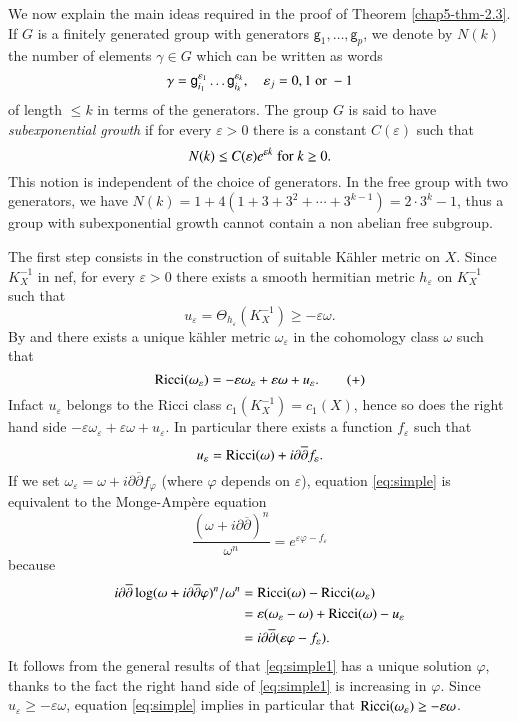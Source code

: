 We now explain the main ideas required in the proof of Theorem \ref{chap5-thm-2.3}. If $G$ is a finitely generated group with generators $\mathsf{g}_{1},\ldots, \mathsf{g}_{p}$, we denote by $N(k)$ the number of elements $\gamma \in G$ which can be written as words
$$
\gamma = \mathsf{g}_{i_{1}}^{\varepsilon_{1}}\ldots\mathsf{g}_{i_{k}}^{\varepsilon_{k}}, \quad \varepsilon_{j} = 0, 1 \; \text{\rm or} \; -1
$$
of length $\leq k$ in terms of the generators. The group $G$ is said to have \textit{subexponential growth} if for every $\varepsilon > 0$ there is a constant $C(\varepsilon)$ such that
$$
N(k) \leq C(\varepsilon)e^{\varepsilon k}\; \text{\rm for} \; k\geq 0.
$$
This notion is independent of the choice of generators. In the free group with two generators, we have $N(k) = 1+4(1+3+3^{2}+\cdots + 3^{k-1}) =2 \cdot 3^{k} - 1$, thus a group with subexponential growth cannot contain a non abelian free subgroup.

The first step consists in the construction of suitable K\"ahler metric on $X$. Since $K_{X}^{-1}$ in nef, for every $\varepsilon > 0$ there exists a smooth hermitian metric $h_{\varepsilon}$ on $K_{X}^{-1}$ such that
$$
u_{\varepsilon} = \Theta _{h_{\varepsilon}}(K_{X}^{-1}) \geq -\varepsilon\omega.
$$
By \cite{chap5-keyY77} and \cite{chap5-keyY78} there exists a unique k\"ahler metric $\omega_{\varepsilon}$ in the cohomology class ${\omega}$ such that
\begin{equation}
\operatorname{Ricci}(\omega_{\varepsilon}) = -\varepsilon\omega_{\varepsilon} + \varepsilon\omega + u_{\varepsilon}.\tag{+}\label{eq:simple}
\end{equation}
In\pageoriginale fact $u_{\varepsilon}$ belongs to the Ricci class $c_{1}(K_{X}^{-1}) = c_{1}(X)$, hence so does the right hand side $-\varepsilon\omega_{\varepsilon} + \varepsilon\omega + u_{\varepsilon}$. In particular there exists a function $f_{\varepsilon}$ such that
$$
u_{\varepsilon} = \operatorname{Ricci}(\omega) + i \partial\overline{\partial}f_{\varepsilon}.
$$
If we set $\omega_{\varepsilon} = \omega + i \partial\overline{\partial}f_{\varphi}$ (where $\varphi$ depends on $\varepsilon$), equation \eqref{eq:simple} is equivalent to the Monge-Amp\`ere equation
\begin{equation}
\dfrac{\left(\omega + i \partial \overline\partial\right)^{n}}{\omega^{n}} = e^{\varepsilon\varphi-f_{\varepsilon}}\tag{++}\label{eq:simple1}
\end{equation}
because
\begin{align*}
i\partial\overline\partial\log(\omega + i \partial\overline\partial \varphi)^{n}/\omega^{n} &= \operatorname{Ricci}(\omega) - \operatorname{Ricci}(\omega_{\varepsilon})\\
&=\varepsilon(\omega_{\varepsilon} - \omega) + \operatorname{Ricci}(\omega) - u_{\varepsilon}\\
&= i\partial\overline\partial(\varepsilon \varphi - f_{\varepsilon}).
\end{align*}
It follows from the general results of \cite{chap5-keyY78} that \eqref{eq:simple1} has a unique solution $\varphi$, thanks to the fact the right hand side of \eqref{eq:simple1} is increasing in $\varphi$. Since $u_{\varepsilon} \geq -\varepsilon\omega$, equation \eqref{eq:simple} implies in particular that $\operatorname{Ricci}(\omega_{\varepsilon}) \geq -\varepsilon \omega$.

